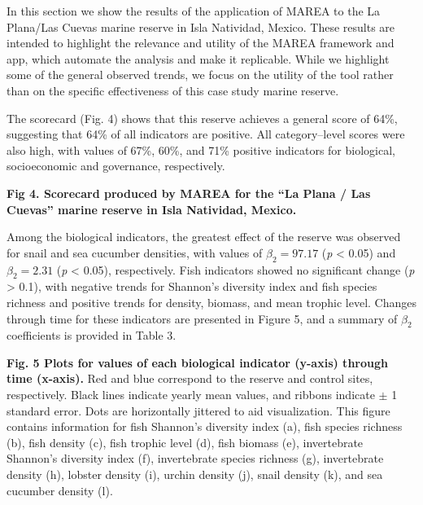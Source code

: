 \documentclass[12pt,]{article}
\begin{document}
In this section we show the results of the application of MAREA to the
La Plana/Las Cuevas marine reserve in Isla Natividad, Mexico. These
results are intended to highlight the relevance and utility of the MAREA
framework and app, which automate the analysis and make it replicable.
While we highlight some of the general observed trends, we focus on the
utility of the tool rather than on the specific effectiveness of this
case study marine reserve.

The scorecard (Fig. 4) shows that this reserve achieves a general score
of 64\%, suggesting that 64\% of all indicators are positive. All
category--level scores were also high, with values of 67\%, 60\%, and
71\% positive indicators for biological, socioeconomic and governance,
respectively.

\textbf{Fig 4. Scorecard produced by MAREA for the ``La Plana / Las
Cuevas'' marine reserve in Isla Natividad, Mexico.}

Among the biological indicators, the greatest effect of the reserve was
observed for snail and sea cucumber densities, with values of
\(\beta_2 = 97.17\) (\emph{p} \textless{} 0.05) and \(\beta_2 = 2.31\)
(\emph{p} \textless{} 0.05), respectively. Fish indicators showed no
significant change (\emph{p} \textgreater{} 0.1), with negative trends
for Shannon's diversity index and fish species richness and positive
trends for density, biomass, and mean trophic level. Changes through
time for these indicators are presented in Figure 5, and a summary of
\(\beta_2\) coefficients is provided in Table 3.

\clearpage

\textbf{Fig. 5 Plots for values of each biological indicator (y-axis)
through time (x-axis).} Red and blue correspond to the reserve and
control sites, respectively. Black lines indicate yearly mean values,
and ribbons indicate \(\pm\) 1 standard error. Dots are horizontally
jittered to aid visualization. This figure contains information for fish
Shannon's diversity index (a), fish species richness (b), fish density
(c), fish trophic level (d), fish biomass (e), invertebrate Shannon's
diversity index (f), invertebrate species richness (g), invertebrate
density (h), lobster density (i), urchin density (j), snail density (k),
and sea cucumber density (l).
\end{document}
